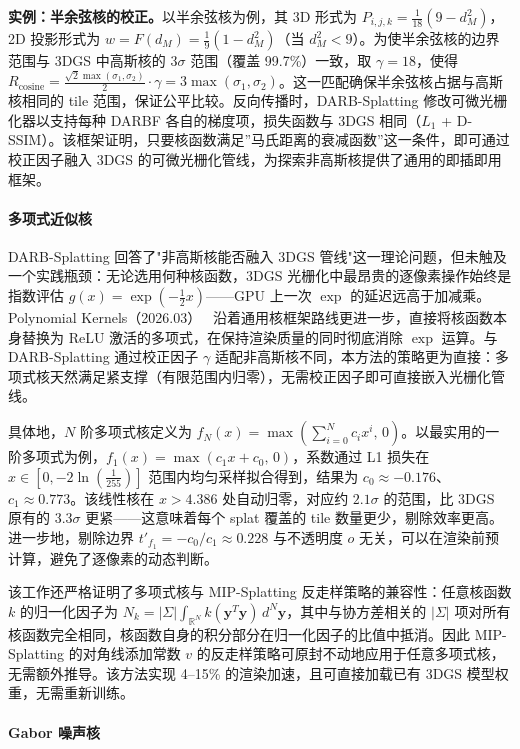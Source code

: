 \textbf{实例：半余弦核的校正。}\quad 以半余弦核为例，其 3D 形式为 $P_{i,j,k} = \frac{1}{18}(9 - d_M^2)$，2D 投影形式为 $w = F(d_M) = \frac{1}{9}(1 - d_M^2)$（当 $d_M^2 < 9$）。为使半余弦核的边界范围与 3DGS 中高斯核的 $3\sigma$ 范围（覆盖 99.7\%）一致，取 $\gamma = 18$，使得 $R_{\text{cosine}} = \frac{\sqrt{2}\max(\sigma_1,\sigma_2)}{2}\cdot\gamma = 3\max(\sigma_1,\sigma_2)$。这一匹配确保半余弦核占据与高斯核相同的 tile 范围，保证公平比较。反向传播时，DARB-Splatting 修改可微光栅化器以支持每种 DARBF 各自的梯度项，损失函数与 3DGS 相同（$L_1$ + D-SSIM）。该框架证明，只要核函数满足”马氏距离的衰减函数”这一条件，即可通过校正因子融入 3DGS 的可微光栅化管线，为探索非高斯核提供了通用的即插即用框架。

\paragraph{多项式近似核}

DARB-Splatting 回答了"非高斯核能否融入 3DGS 管线"这一理论问题，但未触及一个实践瓶颈：无论选用何种核函数，3DGS 光栅化中最昂贵的逐像素操作始终是指数评估 $g(x)=\exp(-\frac{1}{2}x)$——GPU 上一次 $\exp$ 的延迟远高于加减乘。Polynomial Kernels（2026.03）~\cite{2603_18707} 沿着通用核框架路线更进一步，直接将核函数本身替换为 ReLU 激活的多项式，在保持渲染质量的同时彻底消除 $\exp$ 运算。与 DARB-Splatting 通过校正因子 $\gamma$ 适配非高斯核不同，本方法的策略更为直接：多项式核天然满足紧支撑（有限范围内归零），无需校正因子即可直接嵌入光栅化管线。

具体地，$N$ 阶多项式核定义为 $f_N(x)=\max(\sum_{i=0}^{N}c_i x^i,\, 0)$。以最实用的一阶多项式为例，$f_1(x)=\max(c_1 x + c_0,\, 0)$，系数通过 L1 损失在 $x\in[0, -2\ln(\frac{1}{255})]$ 范围内均匀采样拟合得到，结果为 $c_0\approx -0.176$、$c_1\approx 0.773$。该线性核在 $x>4.386$ 处自动归零，对应约 $2.1\sigma$ 的范围，比 3DGS 原有的 $3.3\sigma$ 更紧——这意味着每个 splat 覆盖的 tile 数量更少，剔除效率更高。进一步地，剔除边界 $t'_{f_1}=-c_0/c_1\approx 0.228$ 与不透明度 $o$ 无关，可以在渲染前预计算，避免了逐像素的动态判断。

该工作还严格证明了多项式核与 MIP-Splatting 反走样策略的兼容性：任意核函数 $k$ 的归一化因子为 $N_k = |\Sigma|\int_{\mathbb{R}^N}k(\mathbf{y}^T\mathbf{y})\,d^N\mathbf{y}$，其中与协方差相关的 $|\Sigma|$ 项对所有核函数完全相同，核函数自身的积分部分在归一化因子的比值中抵消。因此 MIP-Splatting 的对角线添加常数 $v$ 的反走样策略可原封不动地应用于任意多项式核，无需额外推导。该方法实现 4--15\% 的渲染加速，且可直接加载已有 3DGS 模型权重，无需重新训练。

\paragraph{Gabor 噪声核}

